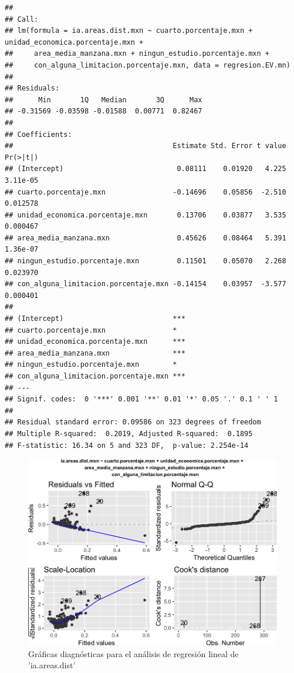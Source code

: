 \documentclass[12pt,]{book}
\begin{document}
\begin{verbatim}
## 
## Call:
## lm(formula = ia.areas.dist.mxn ~ cuarto.porcentaje.mxn + unidad_economica.porcentaje.mxn + 
##     area_media_manzana.mxn + ningun_estudio.porcentaje.mxn + 
##     con_alguna_limitacion.porcentaje.mxn, data = regresion.EV.mn)
## 
## Residuals:
##      Min       1Q   Median       3Q      Max 
## -0.31569 -0.03598 -0.01588  0.00771  0.82467 
## 
## Coefficients:
##                                      Estimate Std. Error t value Pr(>|t|)
## (Intercept)                           0.08111    0.01920   4.225 3.11e-05
## cuarto.porcentaje.mxn                -0.14696    0.05856  -2.510 0.012578
## unidad_economica.porcentaje.mxn       0.13706    0.03877   3.535 0.000467
## area_media_manzana.mxn                0.45626    0.08464   5.391 1.36e-07
## ningun_estudio.porcentaje.mxn         0.11501    0.05070   2.268 0.023970
## con_alguna_limitacion.porcentaje.mxn -0.14154    0.03957  -3.577 0.000401
##                                         
## (Intercept)                          ***
## cuarto.porcentaje.mxn                *  
## unidad_economica.porcentaje.mxn      ***
## area_media_manzana.mxn               ***
## ningun_estudio.porcentaje.mxn        *  
## con_alguna_limitacion.porcentaje.mxn ***
## ---
## Signif. codes:  0 '***' 0.001 '**' 0.01 '*' 0.05 '.' 0.1 ' ' 1
## 
## Residual standard error: 0.09586 on 323 degrees of freedom
## Multiple R-squared:  0.2019, Adjusted R-squared:  0.1895 
## F-statistic: 16.34 on 5 and 323 DF,  p-value: 2.254e-14
\end{verbatim}

\begin{figure}
\includegraphics[width=1\linewidth]{tesis-unigis_files/figure-latex/diagn-lm-areadist-sel-1} \caption{Gráficas diagnósticas para el análisis de regresión lineal de 'ia.areas.dist'}\label{fig:diagn-lm-areadist-sel}
\end{figure}
\end{document}
